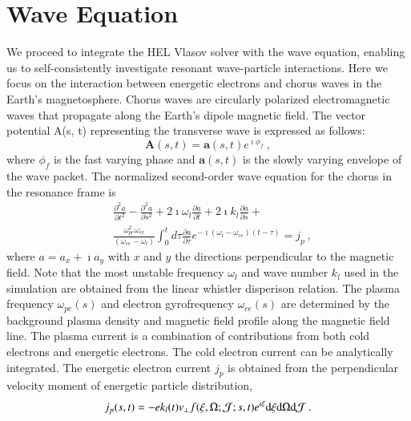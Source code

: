 \section{Wave Equation}
\label{sec:wave}

We proceed to integrate the HEL Vlasov solver with the wave equation, enabling us to self-consistently investigate resonant wave-particle interactions. Here we focus on the interaction between energetic electrons and chorus waves in the Earth's magnetosphere. Chorus waves are circularly polarized electromagnetic waves that propagate along the Earth's dipole magnetic field. The vector potential A(s, t) representing the transverse wave is expressed as follows:
\begin{equation}
    \mathbf{A}(s,t) = \mathbf{a}(s,t)e^{\imath \phi_f}~,
\end{equation}
where $\phi_f$ is the fast varying phase and $\mathbf{a}(s,t)$ is the slowly varying envelope of the wave packet. 
The normalized second-order wave equation for the chorus in the resonance frame  is 
\begin{equation}\label{eq.Wave}
    \begin{aligned}
        &\frac{\partial^2 a}{\partial t^2} - \frac{\partial^2 a}{\partial s^2} + {2\imath\omega_l}\frac{\partial a}{\partial t} + 2\imath k_l\frac{\partial a}{\partial s} + \\
        &\frac{\omega_{pe}^2 \omega_{ce}}{(\omega_{ce}-\omega_l)} \int_0^t d \tau \frac{\partial a}{\partial \tau} e^{-\imath\left(\omega_l-\omega_{c e}\right)(t-\tau)} = j_p~,
        \end{aligned}
      \end{equation}
where $a = a_x + \imath a_y$ with $x$ and $y$ the directions perpendicular to the  magnetic field. Note that the most unstable frequency $\omega_l$ and wave number $k_l$ used in the simulation are obtained from  the linear whistler disperison relation.
The plasma frequency $\omega_{pe}(s)$ and electron gyrofrequency $\omega_{ce}(s)$
are determined by the background plasma density and magnetic field profile along the magnetic field line.
The plasma current is a combination of contributions from both cold electrons and energetic electrons. The cold electron current can be analytically integrated. 
The energetic electron current $j_p$ is obtained from the perpendicular velocity moment of energetic particle distribution,
\begin{equation}
    j_p(s,t) = - 
ek_l(t)
    \iiint 
v_\perp
    f(\xi,\Omega;\mathcal{J};s,t) e^{\imath \xi} \rm d \xi \rm d \Omega \rm d \mathcal{J}~.
\end{equation}

